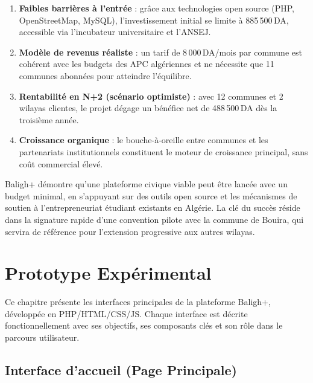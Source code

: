 \documentclass[12pt,a4paper]{report}
\begin{document}
\begin{enumerate}
  \item \textbf{Faibles barrières à l'entrée} : grâce aux technologies open
        source (PHP, OpenStreetMap, MySQL), l'investissement initial se limite
        à 885\,500\,DA, accessible via l'incubateur universitaire et l'ANSEJ.

  \item \textbf{Modèle de revenus réaliste} : un tarif de 8\,000\,DA/mois par
        commune est cohérent avec les budgets des APC algériennes et ne
        nécessite que 11 communes abonnées pour atteindre l'équilibre.

  \item \textbf{Rentabilité en N+2 (scénario optimiste)} : avec 12 communes et
        2 wilayas clientes, le projet dégage un bénéfice net de 488\,500\,DA
        dès la troisième année.

  \item \textbf{Croissance organique} : le bouche-à-oreille entre communes et
        les partenariats institutionnels constituent le moteur de croissance
        principal, sans coût commercial élevé.
\end{enumerate}

\begin{notebox}
  Baligh+ démontre qu'une plateforme civique viable peut être lancée avec un
  budget minimal, en s'appuyant sur des outils open source et les mécanismes
  de soutien à l'entrepreneuriat étudiant existants en Algérie. La clé du
  succès réside dans la signature rapide d'une convention pilote avec la
  commune de Bouira, qui servira de référence pour l'extension progressive aux
  autres wilayas.
\end{notebox}

\chapter{Prototype Expérimental}

Ce chapitre présente les interfaces principales de la plateforme Baligh+,
développée en PHP/HTML/CSS/JS. Chaque interface est décrite fonctionnellement
avec ses objectifs, ses composants clés et son rôle dans le parcours
utilisateur.

\section{Interface d'accueil (Page Principale)}
\end{document}
